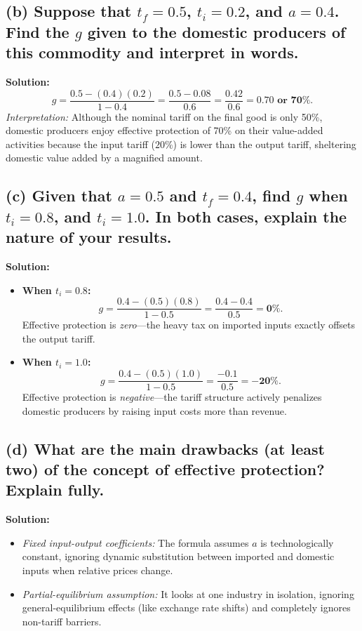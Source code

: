 \documentclass[11pt, letterpaper]{article}
\begin{document}
\subsection*{(b) Suppose that $t_f = 0.5$, $t_i = 0.2$, and $a = 0.4$. Find the $g$ given to the domestic producers of this commodity and interpret in words.}
\noindent \textbf{Solution:}
\[
  g = \frac{0.5 - (0.4)(0.2)}{1 - 0.4} = \frac{0.5 - 0.08}{0.6} = \frac{0.42}{0.6} = \mathbf{0.70 \text{ or } 70\%}.
\]
\textit{Interpretation:} Although the nominal tariff on the final good is only 50\%, domestic producers enjoy effective protection of 70\% on their value-added activities because the input tariff ($20\%$) is lower than the output tariff, sheltering domestic value added by a magnified amount.

\subsection*{(c) Given that $a = 0.5$ and $t_f = 0.4$, find $g$ when $t_i = 0.8$, and $t_i = 1.0$. In both cases, explain the nature of your results.}
\noindent \textbf{Solution:}
\begin{itemize}
  \item \textbf{When $t_i = 0.8$:}
    \[
      g = \frac{0.4 - (0.5)(0.8)}{1 - 0.5} = \frac{0.4 - 0.4}{0.5} = \mathbf{0\%}.
    \]
    Effective protection is \textit{zero}---the heavy tax on imported inputs exactly offsets the output tariff.

  \item \textbf{When $t_i = 1.0$:}
    \[
      g = \frac{0.4 - (0.5)(1.0)}{1 - 0.5} = \frac{-0.1}{0.5} = \mathbf{-20\%}.
    \]
    Effective protection is \textit{negative}---the tariff structure actively penalizes domestic producers by raising input costs more than revenue.
\end{itemize}

\subsection*{(d) What are the main drawbacks (at least two) of the concept of effective protection? Explain fully.}
\noindent \textbf{Solution:}
\begin{itemize}
  \item \textit{Fixed input-output coefficients:} The formula assumes $a$ is technologically constant, ignoring dynamic substitution between imported and domestic inputs when relative prices change.
  \item \textit{Partial-equilibrium assumption:} It looks at one industry in isolation, ignoring general-equilibrium effects (like exchange rate shifts) and completely ignores non-tariff barriers.
\end{itemize}
\end{document}
